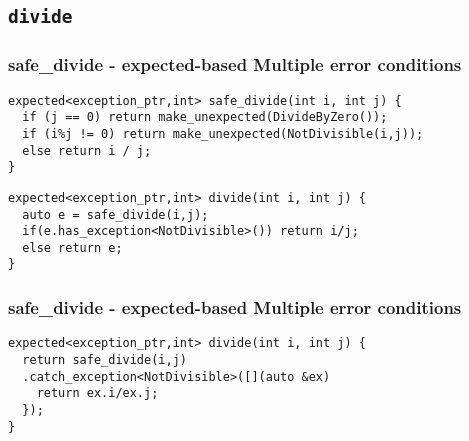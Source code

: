 \documentclass[xcolor=dvipsnames]{beamer}
\newcommand{\cpp}[1]{\lstinline{#1}}
\begin{document}
\subsection{\cpp{divide}}
\begin{frame}[fragile]
\frametitle{safe\_divide  - expected-based Multiple error conditions}

\begin{lstlisting}
expected<exception_ptr,int> safe_divide(int i, int j) {
  if (j == 0) return make_unexpected(DivideByZero()); 
  if (i%j != 0) return make_unexpected(NotDivisible(i,j));
  else return i / j; 
}
\end{lstlisting}

\begin{lstlisting}
expected<exception_ptr,int> divide(int i, int j) {
  auto e = safe_divide(i,j);
  if(e.has_exception<NotDivisible>()) return i/j;
  else return e;
}
\end{lstlisting}
\end{frame}
\begin{frame}[fragile]
\frametitle{safe\_divide  - expected-based Multiple error conditions}


\begin{lstlisting}
expected<exception_ptr,int> divide(int i, int j) {
  return safe_divide(i,j)
  .catch_exception<NotDivisible>([](auto &ex)
    return ex.i/ex.j;
  });
}
\end{lstlisting}

\end{frame}
\end{document}
